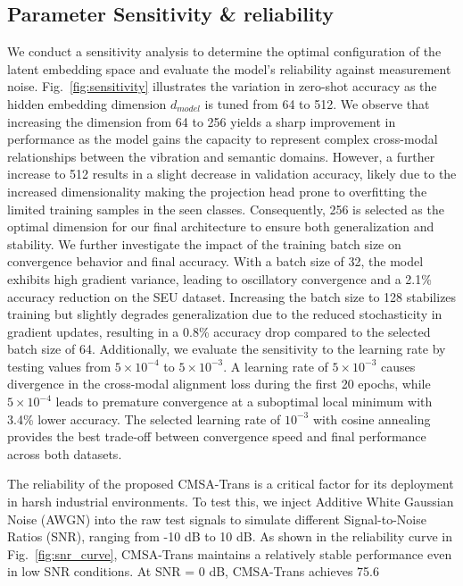 \subsection{Parameter Sensitivity & reliability}
We conduct a sensitivity analysis to determine the optimal configuration of the latent embedding space and evaluate the model's reliability against measurement noise. Fig.~\ref{fig:sensitivity} illustrates the variation in zero-shot accuracy as the hidden embedding dimension $d_{model}$ is tuned from 64 to 512. We observe that increasing the dimension from 64 to 256 yields a sharp improvement in performance as the model gains the capacity to represent complex cross-modal relationships between the vibration and semantic domains. However, a further increase to 512 results in a slight decrease in validation accuracy, likely due to the increased dimensionality making the projection head prone to overfitting the limited training samples in the seen classes. Consequently, 256 is selected as the optimal dimension for our final architecture to ensure both generalization and stability. We further investigate the impact of the training batch size on convergence behavior and final accuracy. With a batch size of 32, the model exhibits high gradient variance, leading to oscillatory convergence and a 2.1\% accuracy reduction on the SEU dataset. Increasing the batch size to 128 stabilizes training but slightly degrades generalization due to the reduced stochasticity in gradient updates, resulting in a 0.8\% accuracy drop compared to the selected batch size of 64. Additionally, we evaluate the sensitivity to the learning rate by testing values from $5 \times 10^{-4}$ to $5 \times 10^{-3}$. A learning rate of $5 \times 10^{-3}$ causes divergence in the cross-modal alignment loss during the first 20 epochs, while $5 \times 10^{-4}$ leads to premature convergence at a suboptimal local minimum with 3.4\% lower accuracy. The selected learning rate of $10^{-3}$ with cosine annealing provides the best trade-off between convergence speed and final performance across both datasets.

The reliability of the proposed CMSA-Trans is a critical factor for its deployment in harsh industrial environments. To test this, we inject Additive White Gaussian Noise (AWGN) into the raw test signals to simulate different Signal-to-Noise Ratios (SNR), ranging from -10 dB to 10 dB. As shown in the reliability curve in Fig.~\ref{fig:snr_curve}, CMSA-Trans maintains a relatively stable performance even in low SNR conditions. At SNR = 0 dB, CMSA-Trans achieves 75.6%

